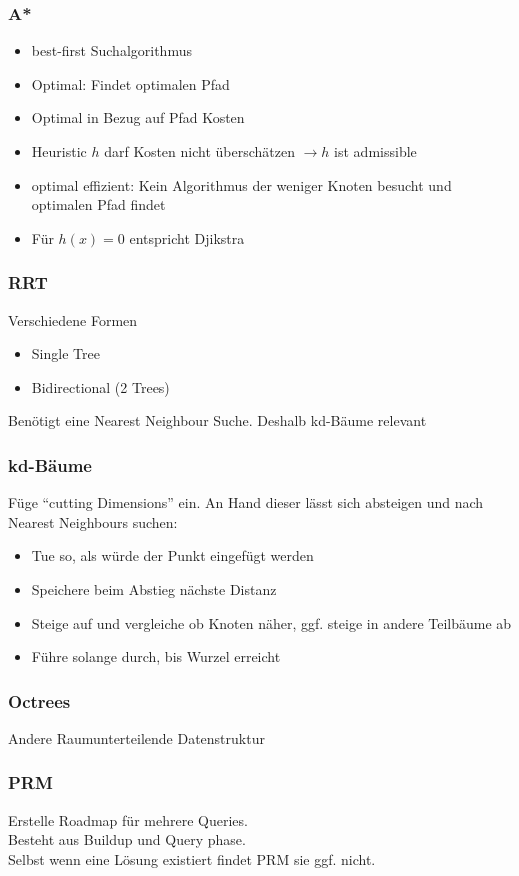 \subsubsection{A*}
\label{ssub:a*}
\begin{itemize}
\item best-first Suchalgorithmus
\item Optimal: Findet optimalen Pfad
\item Optimal in Bezug auf Pfad Kosten
\item Heuristic \(h\) darf Kosten nicht überschätzen \(\rightarrow h\) ist admissible
\item optimal effizient: Kein Algorithmus der weniger Knoten besucht und optimalen Pfad findet
\item Für \(h(x) = 0\) entspricht Djikstra
\end{itemize}

\subsubsection{RRT}
\label{ssub:rrt}
Verschiedene Formen
\begin{itemize}
\item Single Tree
\item Bidirectional (2 Trees)
\end{itemize}
Benötigt eine Nearest Neighbour Suche. Deshalb kd-Bäume relevant

\subsubsection{kd-Bäume}
\label{ssub:kd-baeume}
Füge \enquote{cutting Dimensions} ein. An Hand dieser lässt sich absteigen und nach Nearest Neighbours suchen:
\begin{itemize}
\item Tue so, als würde der Punkt eingefügt werden
\item Speichere beim Abstieg nächste Distanz
\item Steige auf und vergleiche ob Knoten näher, ggf. steige in andere Teilbäume ab
\item Führe solange durch, bis Wurzel erreicht
\end{itemize}

\subsubsection{Octrees}
\label{ssub:octrees}
Andere Raumunterteilende Datenstruktur

\subsubsection{PRM}
\label{ssub:prm}
Erstelle Roadmap für mehrere Queries.\\
Besteht aus Buildup und Query phase.\\
Selbst wenn eine Lösung existiert findet PRM sie ggf. nicht.